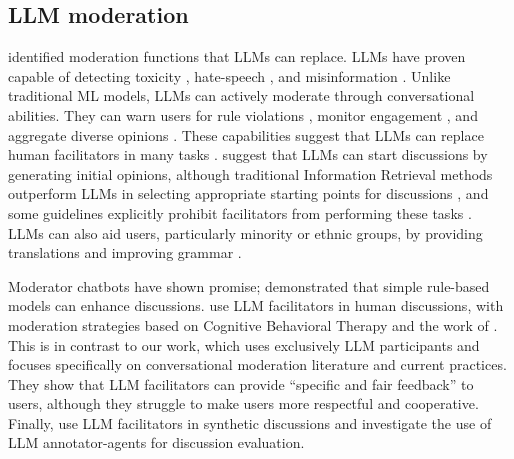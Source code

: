 \subsection{LLM moderation}

\citet{korre2025evaluation} identified moderation functions that \acp{LLM} can replace. \acp{LLM} have proven capable of detecting toxicity \cite{kang-qian-2024-implanting, Wang2022ToxicityDW}, hate-speech \cite{Nirmal2024TowardsIH, shi-2024-hatespeech}, and misinformation \cite{Liu2024DetectIJ, Xu2024ACS}. Unlike traditional \ac{ML} models, \acp{LLM} can actively moderate through conversational abilities. They can warn users for rule violations \cite{Kumar_AbuHashem_Durumeric_2024}, monitor engagement \cite{schroeder-etal-2024-fora}, and aggregate diverse opinions \cite{small-polis-llm}. These capabilities suggest that \acp{LLM} can replace human facilitators in many tasks \cite{seering_self_moderation}. \citet{small-polis-llm} suggest that \acp{LLM} can start discussions by generating initial opinions, although traditional Information Retrieval methods outperform \acp{LLM} in selecting appropriate starting points for discussions \cite{karadzhov2023delidata}, and some guidelines explicitly prohibit facilitators from performing these tasks \cite{dimitra-book}. \acp{LLM} can also aid users, particularly minority or ethnic groups, by providing translations and improving grammar \cite{Tsai2024Generative}. 

Moderator chatbots have shown promise; \citet{kim_et_al_chatbot} demonstrated that simple rule-based models can enhance discussions. \citet{cho-etal-2024-language} use \ac{LLM} facilitators in human discussions, with moderation strategies based on Cognitive Behavioral Therapy and the work of \citet{rosenberg2015nonviolent}. This is in contrast to our work, which uses exclusively \ac{LLM} participants and focuses specifically on conversational moderation literature and current practices. They show that \ac{LLM} facilitators can provide “specific and fair feedback” to users, although they struggle to make users more respectful and cooperative. Finally, \citet{dtsirmpas_thesis} use \ac{LLM} facilitators in synthetic discussions and investigate the use of \ac{LLM} annotator-agents for discussion evaluation.